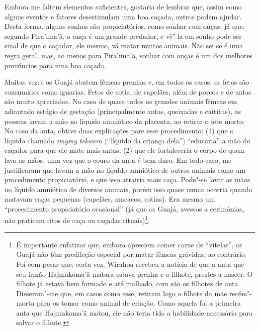 Embora me faltem elementos suficientes, gostaria de lembrar que, assim
como alguns eventos e fatores desestimulam uma boa caçada, outros podem
ajudar. Desta forma, alguns sonhos são propiciatórios, como sonhar com
onças; já que, segundo Pira'ima'ã, a onça é um grande predador, e vê"-la
em sonho pode ser sinal de que o caçador, ele mesmo, vá matar muitos
animais. Não sei se é uma regra geral, mas, ao menos para Pira'ima'ã,
sonhar com onças é um dos melhores prenúncios para uma boa caçada.

Muitas vezes os Guajá abatem fêmeas prenhas e, em todos os casos, os
fetos são consumidos como iguarias. Fetos de cotia, de capelães, além de
porcos e de antas são muito apreciados. No caso de quase todos os
grandes animais fêmeas em adiantado estágio de gestação (principalmente
antas, queixadas e caititus), as pessoas lavam a mão no líquido
amniótico da placenta, ao retirar o feto morto. No caso da anta, obtive
duas explicações pare esse procedimento: (1) que o líquido chamado
\emph{imymy} \emph{tekwera} (``líquido da criança dela'') ``educaria'' a mão
do caçador para que ele mate mais antas, (2) que ele fortaleceria o
corpo de quem lava as mãos, uma vez que o couro da anta é bem duro. Em
todo caso, me justificaram que lavam a mão no líquido amniótico de
outros animais como um procedimento propiciatório, e que isso atrairia
mais caça. Pode"-se lavar as mãos no líquido amniótico de diversos
animais, porém isso quase nunca ocorria quando matavam caças pequenas
(capelães, macacos, cotias). Era mesmo um ``procedimento propiciatório
ocasional'' (já que os Guajá, avessos a cerimônias, não praticam ritos de
caça ou caçadas rituais)\footnote{É importante enfatizar que, embora
  apreciem comer carne de ``vitelas'', os Guajá não têm predileção
  especial por matar fêmeas grávidas; ao contrário. Foi com pesar que,
  certa vez, Wirahoa recebeu a notícia de que a anta que seu irmão
  Hajmakoma'ã matara estava prenha e o filhote, prestes a nascer. O
  filhote já estava bem formado e até malhado, com são os filhotes de
  anta. Disseram"-me que, em casos como esse, retiram logo o filhote da
  mãe recém"-morta para os tomar como animal de criação. Como aquela foi
  a primeira anta que Hajmakoma'ã matou, ele não teria tido a habilidade
  necessária para salvar o filhote.}.

